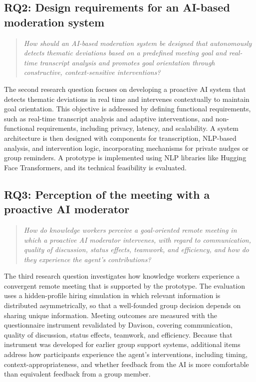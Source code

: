 \subsection{RQ2: Design requirements for an AI-based moderation system}
\begin{quote}
  \textit{How should an AI-based moderation system be designed that autonomously detects thematic deviations
    based on a predefined meeting goal and real-time transcript analysis and promotes goal orientation through
  constructive, context-sensitive interventions?}
\end{quote}
The second research question focuses on developing a proactive AI system that detects thematic deviations in
real time and intervenes contextually to maintain goal orientation. This objective is addressed by defining
functional requirements, such as real-time transcript analysis and adaptive interventions, and non-functional
requirements, including privacy, latency, and scalability. A system architecture is then designed with
components for transcription, NLP-based analysis, and intervention logic, incorporating mechanisms for
private nudges or group reminders. A prototype is implemented using NLP libraries like Hugging Face
Transformers, and its technical feasibility is evaluated.

\subsection{RQ3: Perception of the meeting with a proactive AI moderator}
\begin{quote}
  \textit{How do knowledge workers perceive a goal-oriented remote meeting in which a proactive AI
    moderator intervenes, with regard to communication, quality of discussion, status effects, teamwork,
  and efficiency, and how do they experience the agent's contributions?}
\end{quote}
The third research question investigates how knowledge workers experience a convergent remote
meeting that is supported by the prototype. The evaluation uses a hidden-profile hiring simulation
in which relevant information is distributed asymmetrically, so that a well-founded group decision
depends on sharing unique information. Meeting outcomes are measured with the questionnaire
instrument revalidated by Davison, covering communication, quality of discussion, status effects,
teamwork, and efficiency. Because that instrument was developed for earlier group support systems,
additional items address how participants experience the agent's interventions, including timing,
context-appropriateness, and whether feedback from the AI is more comfortable than equivalent
feedback from a group member.
